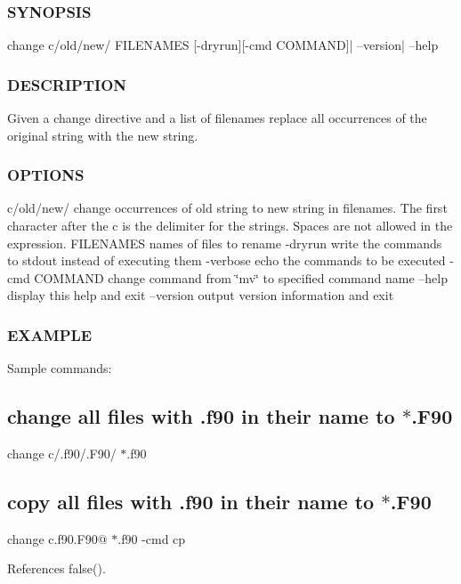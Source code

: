 \subsubsection*{S\+Y\+N\+O\+P\+S\+IS}

\begin{DoxyVerb}change c/old/new/ FILENAMES [-dryrun][-cmd COMMAND]| --version| --help
\end{DoxyVerb}


\subsubsection*{D\+E\+S\+C\+R\+I\+P\+T\+I\+ON}

Given a change directive and a list of filenames replace all occurrences of the original string with the new string.

\subsubsection*{O\+P\+T\+I\+O\+NS}

c/old/new/ change occurrences of old string to new string in filenames. The first character after the c is the delimiter for the strings. Spaces are not allowed in the expression. F\+I\+L\+E\+N\+A\+M\+ES names of files to rename -\/dryrun write the commands to stdout instead of executing them -\/verbose echo the commands to be executed -\/cmd C\+O\+M\+M\+A\+ND change command from \char`\"{}mv\char`\"{} to specified command name --help display this help and exit --version output version information and exit

\subsubsection*{E\+X\+A\+M\+P\+LE}

Sample commands\+:

\subsection*{change all files with .f90 in their name to $\ast$.F90}

change c/.f90/.F90/ $\ast$.f90 \subsection*{copy all files with .f90 in their name to $\ast$.F90}

change c.f90.F90@ $\ast$.f90 -\/cmd cp 

References false().

